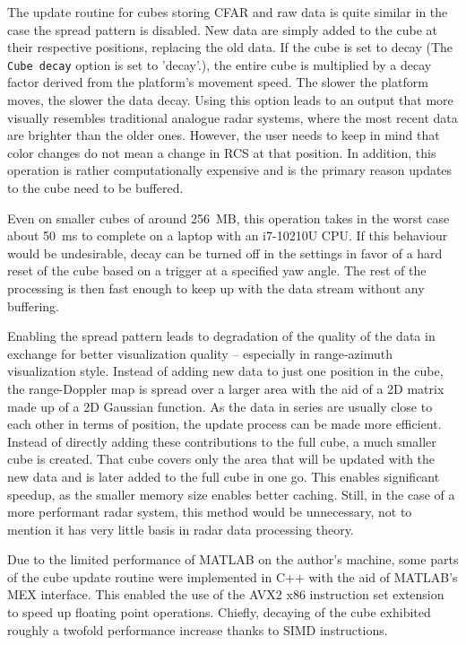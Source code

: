 The update routine for cubes storing CFAR and raw data is quite similar in the case the spread pattern is disabled.
New data are simply added to the cube at their respective positions, replacing the old data.
If the cube is set to decay (The \texttt{Cube decay} option is set to 'decay'.), the entire cube is multiplied by a decay factor derived from the platform’s movement speed.
The slower the platform moves, the slower the data decay.
Using this option leads to an output that more visually resembles traditional analogue radar systems, where the most recent data are brighter than the older ones.
However, the user needs to keep in mind that color changes do not mean a change in RCS at that position.
In addition, this operation is rather computationally expensive and is the primary reason updates to the cube need to be buffered.

Even on smaller cubes of around 256~MB, this operation takes in the worst case about 50~ms to complete on a laptop with an i7-10210U CPU.
If this behaviour would be undesirable, decay can be turned off in the settings in favor of a hard reset of the cube based on a trigger at a specified yaw angle.
The rest of the processing is then fast enough to keep up with the data stream without any buffering.

Enabling the spread pattern leads to degradation of the quality of the data in exchange for better visualization quality -- especially in range-azimuth visualization style.
Instead of adding new data to just one position in the cube, the range-Doppler map is spread over a larger area with the aid of a 2D matrix made up of a 2D Gaussian function.
As the data in series are usually close to each other in terms of position, the update process can be made more efficient.
Instead of directly adding these contributions to the full cube, a much smaller cube is created.
That cube covers only the area that will be updated with the new data and is later added to the full cube in one go.
This enables significant speedup, as the smaller memory size enables better caching.
Still, in the case of a more performant radar system, this method would be unnecessary, not to mention it has very little basis in radar data processing theory.

Due to the limited performance of MATLAB on the author's machine, some parts of the cube update routine were implemented in C++ with the aid of MATLAB's MEX interface.
This enabled the use of the AVX2 x86 instruction set extension to speed up floating point operations.
Chiefly, decaying of the cube exhibited roughly a twofold performance increase thanks to SIMD instructions.


